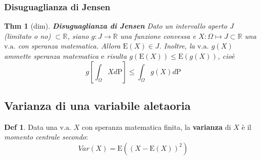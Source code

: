 \documentclass[a4paper,11pt]{article}
\theoremstyle{plain}
\newtheorem{thm}{Thm}[section]
\theoremstyle{definition}
\newtheorem{defn}{Def}[section]
\theoremstyle{remark}
\begin{document}
\subsubsection{Disuguaglianza di Jensen}
\begin{thm}[dim] \textbf{Disuguaglianza di Jensen}
Dato un intervallo aperto $J$ (limitato o no) $\subset \mathbb{R}$, siano $g: J\rightarrow \mathbb{R}$ una funzione convessa e $X :\Omega\mapsto J \subset \mathbb{R}$ una $\mathrm{v}.\mathrm{a}.$ con speranza matematica. Allora $\mathrm{E}(X)\in J$. Inoltre, la $\mathrm{v}.\mathrm{a}.$ $g(X)$ ammette speranza matematica $\mathrm{e}$ risulta $g(\mathrm{E}(X))\leq \mathrm{E}(g(X))$, cioè
$$
g\left[\int_{\Omega}Xd\mathrm{P}\right]\leq\int_{\Omega}g(X)d\mathrm{P}
$$
\end{thm}


\subsection{Varianza di una variabile aletaoria}
\begin{defn}
Data una $\mathrm{v}.\mathrm{a}.$ $X$ con speranza matematica finita, la \textbf{varianza} di $X$ è il {\it momento centrale secondo}:
$$
Var (X)=\mathrm{E}((X-\mathrm{E}(X))^{2})
$$
\end{defn}
\end{document}
